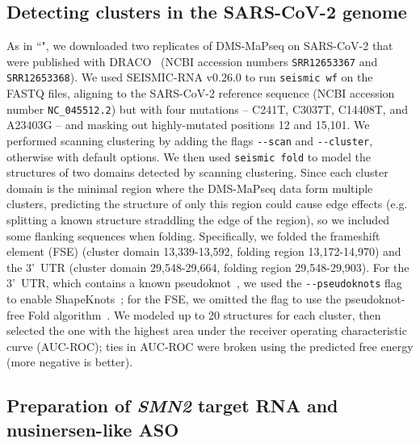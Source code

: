 \documentclass[unnumsec,webpdf,contemporary,large]{oup-authoring-template}%
\theoremstyle{thmstyleone}%
\theoremstyle{thmstyletwo}%
\theoremstyle{thmstylethree}%
\begin{document}
\subsection{Detecting clusters in the SARS-CoV-2 genome}

As in ``", we downloaded two replicates of DMS-MaPseq on SARS-CoV-2 that were published with DRACO~\cite{Morandi2021} (NCBI accession numbers \verb|SRR12653367| and \verb|SRR12653368|).
We used SEISMIC-RNA v0.26.0 to run \verb|seismic wf| on the FASTQ files, aligning to the SARS-CoV-2 reference sequence (NCBI accession number \verb|NC_045512.2|) but with four mutations -- C241T, C3037T, C14408T, and A23403G -- and masking out highly-mutated positions 12 and 15,101.
We performed scanning clustering by adding the flags \verb|--scan| and \verb|--cluster|, otherwise with default options.
We then used \verb|seismic fold| to model the structures of two domains detected by scanning clustering.
Since each cluster domain is the minimal region where the DMS-MaPseq data form multiple clusters, predicting the structure of only this region could cause edge effects (e.g. splitting a known structure straddling the edge of the region), so we included some flanking sequences when folding.
Specifically, we folded the frameshift element (FSE) (cluster domain 13,339-13,592, folding region 13,172-14,970) and the 3'~UTR (cluster domain 29,548-29,664, folding region 29,548-29,903).
For the 3'~UTR, which contains a known pseudoknot~\cite{Yang2015a}, we used the \verb|--pseudoknots| flag to enable ShapeKnots~\cite{Hajdin2013}; for the FSE, we omitted the flag to use the pseudoknot-free Fold algorithm~\cite{Reuter2010}.
We modeled up to 20 structures for each cluster, then selected the one with the highest area under the receiver operating characteristic curve (AUC-ROC); ties in AUC-ROC were broken using the predicted free energy (more negative is better).


\subsection{Preparation of \textmd{\textit{SMN2}} target RNA and nusinersen-like ASO}
\end{document}
